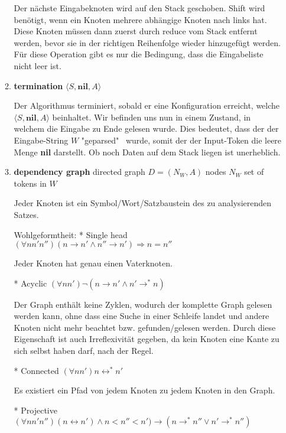 \documentclass[a4paper]{scrartcl}
\begin{document}
\begin{enumerate}
\begin{enumerate}[label=(\alph*)]
{            Der nächste Eingabeknoten wird auf den Stack geschoben. Shift wird benötigt, wenn ein Knoten mehrere abhängige Knoten nach links hat. Diese Knoten müssen dann zuerst durch reduce vom Stack entfernt werden, bevor sie in der richtigen Reihenfolge wieder hinzugefügt werden. Für diese Operation gibt es nur die Bedingung, dass die Eingabeliste nicht leer ist.
        }
			
            \item
            {
            \textbf{termination} $\langle S, \textbf{nil}, A \rangle$
            
            Der Algorithmus terminiert, sobald er eine Konfiguration erreicht, welche $\langle S, \textbf{nil}, A \rangle$ beinhaltet. Wir befinden uns nun in einem Zustand, in welchem die Eingabe zu Ende gelesen wurde. Dies bedeutet, dass der der Eingabe-String $W$ "geparsed" \ wurde, somit der der Input-Token die leere Menge \textbf{nil} darstellt. Ob noch Daten auf dem Stack liegen ist unerheblich.
	        }

            \item
            {
            \textbf{dependency graph}
            directed graph $D = (N_W, A)$
            nodes $N_W$ set of tokens in $W$
            
            Jeder Knoten ist ein Symbol/Wort/Satzbaustein des zu analysierenden Satzes.
            
            Wohlgeformtheit:
            * Single head  $(\forall n n' n'') (n \rightarrow n' \land n'' \rightarrow n') \Rightarrow n = n''$
            
            Jeder Knoten hat genau einen Vaterknoten.
            
            * Acyclic      $(\forall n n') \lnot (n \rightarrow n' \land n' \rightarrow^\ast n)$
            
            Der Graph enthält keine Zyklen, wodurch der komplette Graph gelesen werden kann, ohne dass eine Suche in einer Schleife landet und andere Knoten nicht mehr beachtet bzw. gefunden/gelesen werden. Durch diese Eigenschaft ist auch Irreflexivität gegeben, da kein Knoten eine Kante zu sich selbst haben darf, nach der Regel.
            
            * Connected    $(\forall n n') n \leftrightarrow^\ast n'$
            
            Es existiert ein Pfad von jedem Knoten zu jedem Knoten in den Graph.
            
            * Projective   $(\forall n n' n'') (n \leftrightarrow n') \land n < n'' < n') \rightarrow (n \rightarrow^\ast n'' \lor n' \rightarrow^\ast n'')$
	        }
            

\end{enumerate}
\end{enumerate}
\end{document}
